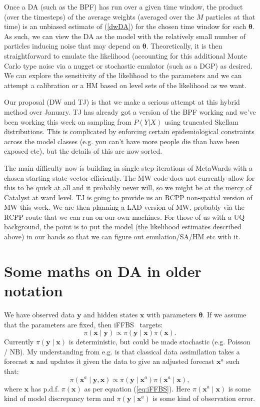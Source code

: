 \documentclass[a4paper]{article}
\newcommand{\btheta}{\bm{\theta}}
\newcommand{\bx}{\bm{x}}
\newcommand{\by}{\bm{y}}
\begin{document}
Once a DA (such as the BPF) has run over a given time window, the product (over the timesteps) of the average weights (averaged over the $M$ particles at that time) is an unbiased estimate of (\ref{dwDA}) for the chosen time window for each $\btheta$. As such, we can view the DA as the model with the relatively small number of particles inducing noise that may depend on $\btheta$. Theoretically, it is then straightforward to emulate the likelihood (accounting for this additional Monte Carlo type noise via a nugget or stochastic emulator (such as a DGP) as desired. We can explore the sensitivity of the likelihood to the parameters and we can attempt a calibration or a HM based on level sets of the likelihood as we want. 

Our proposal (DW and TJ) is that we make a serious attempt at this hybrid method over January. TJ has already got a version of the BPF working and we've been working this week on sampling from $P(Y|X)$ using truncated Skellam distributions. This is complicated by enforcing certain epidemiological constraints across the model classes (e.g. you can't have more people die than have been exposed etc), but the details of this are now sorted. 

The main difficulty now is building in single step iterations of MetaWards with a chosen starting state vector efficiently. The MW code does not currently allow for this to be quick at all and it probably never will, so we might be at the mercy of Catalyst at ward level. TJ is going to provide us an RCPP non-spatial version of MW this week. We are then planning a LAD version of MW, probably via the RCPP route that we can run on our own machines. For those of us with a UQ background, the point is to put the model (the likelihood estimates described above) in our hands so that we can figure out emulation/SA/HM etc with it. 

\section*{Some maths on DA in older notation}

We have observed data $\by$ and hidden states $\bx$ with parameters $\btheta$. If we assume that the parameters are fixed, then iFFBS~\citep{touloupouetal:2020} targets:
\begin{equation}
    \pi\left(\bx \mid \by\right) \propto \pi\left(\by \mid \bx\right)\pi\left(\bx\right). \label{eq:iFFBS}
\end{equation}
Currently $\pi\left(\by \mid \bx\right)$ is deterministic, but could be made stochastic (e.g. Poisson / NB). My understanding from e.g. \cite{lahoz_schneider:2014} is that classical data assimilation takes a forecast $\bx$ and updates it given the data to give an adjusted forecast $\bx^a$ such that:
\begin{equation}
    \pi\left(\bx^a \mid \by, \bx\right) \propto \pi\left(\by \mid \bx^a\right)\pi\left(\bx^a \mid \bx\right), \label{eq:DA}
\end{equation}
where $\bx$ has p.d.f. $\pi\left(\bx\right)$ as per equation (\ref{eq:iFFBS}). Here $\pi\left(\bx^a \mid \bx\right)$ is some kind of model discrepancy term and $\pi\left(\by \mid \bx^a\right)$ is some kind of observation error. 
\end{document}
